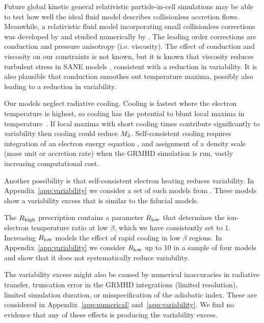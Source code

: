 Future global kinetic general relativistic particle-in-cell simulations may be able to test how well the ideal fluid model describes collisionless accretion flows.
Meanwhile, a relativistic fluid model incorporating small collisionless corrections was developed by \citet{2015ApJ...810..162C} and studied numerically by \citet{2017MNRAS.470.2240F}.
The leading order corrections are conduction and pressure anisotropy (i.e. viscosity).
The effect of conduction and viscosity on our constraints is not known, but it is known that viscosity reduces turbulent stress in SANE models \citep{2017MNRAS.470.2240F}, consistent with a reduction in variability.
It is also plausible that conduction smoothes out temperature maxima, possibly also leading to a reduction in variability.

Our models neglect radiative cooling.
Cooling is fastest where the electron temperature is highest, so cooling has the potential to blunt local maxima in temperature~\citep{2020MNRAS.499.3178Y}.
If local maxima with short cooling times contribute significantly to variability then cooling could reduce $M_{3}$.
Self-consistent cooling requires integration of an electron energy equation \citep[e.g.][]{2015MNRAS.454.1848R}, and assignment of a density scale (mass unit or accretion rate) when the GRMHD simulation is run, vastly increasing computational cost.

Another possibility is that self-consistent electron heating reduces variability.
In Appendix~\ref{app:variability} we consider a set of such models from \citet{2020MNRAS.494.4168D}.
These models show a variability excess that is similar to the fiducial models.

The $R_\mathrm{high}$ prescription contains a parameter $R_\mathrm{low}$ that determines the ion-electron temperature ratio at low $\beta$, which we have consistently set to $1$.
Increasing $R_\mathrm{low}$ models the effect of rapid cooling in low $\beta$ regions.
In Appendix~\ref{app:variability} we consider $R_\mathrm{low}$ up to 10 in a sample of four models and show that it does not systematically reduce variability.

The variability excess might also be caused by numerical inaccuracies in radiative transfer, truncation error in the GRMHD integrations (limited resolution), limited simulation duration, or misspecification of the adiabatic index.
These are considered in Appendix~\ref{app:numerical} and~\ref{app:variability}.
We find no evidence that any of these effects is producing the variability excess.

